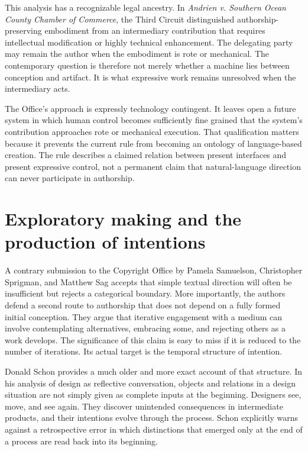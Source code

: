 \documentclass[11pt]{article}
\begin{document}
This analysis has a recognizable legal ancestry. In \textit{Andrien v. Southern Ocean County Chamber of Commerce}, the Third Circuit distinguished authorship-preserving embodiment from an intermediary contribution that requires intellectual modification or highly technical enhancement. The delegating party may remain the author when the embodiment is rote or mechanical.\cite{andrien1991} The contemporary question is therefore not merely whether a machine lies between conception and artifact. It is what expressive work remains unresolved when the intermediary acts.

The Office's approach is expressly technology contingent. It leaves open a future system in which human control becomes sufficiently fine grained that the system's contribution approaches rote or mechanical execution.\cite{usco2025copyrightability} That qualification matters because it prevents the current rule from becoming an ontology of language-based creation. The rule describes a claimed relation between present interfaces and present expressive control, not a permanent claim that natural-language direction can never participate in authorship.

\section{Exploratory making and the production of intentions}
A contrary submission to the Copyright Office by Pamela Samuelson, Christopher Sprigman, and Matthew Sag accepts that simple textual direction will often be insufficient but rejects a categorical boundary. More importantly, the authors defend a second route to authorship that does not depend on a fully formed initial conception. They argue that iterative engagement with a medium can involve contemplating alternatives, embracing some, and rejecting others as a work develops.\cite{samuelson2023comments} The significance of this claim is easy to miss if it is reduced to the number of iterations. Its actual target is the temporal structure of intention.

Donald Schon provides a much older and more exact account of that structure. In his analysis of design as reflective conversation, objects and relations in a design situation are not simply given as complete inputs at the beginning. Designers see, move, and see again. They discover unintended consequences in intermediate products, and their intentions evolve through the process. Schon explicitly warns against a retrospective error in which distinctions that emerged only at the end of a process are read back into its beginning.\cite{schon1992reflective}
\end{document}
